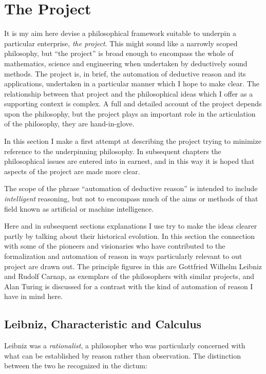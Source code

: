 
\chapter{The Project}\label{TheProject}

It is my aim here devise a philosophical framework suitable to
underpin a particular enterprise, \emph{the project}. 
This might sound like a narrowly scoped philosophy, but ``the
project'' is broad enough to encompass the whole of mathematics,
science and engineering when undertaken by deductively sound methods. 
The project is, in brief, the automation of deductive reason and its
applications, undertaken in a particular manner which I hope to make
clear. 
The relationship between that project and the philosophical ideas
which I offer as a supporting context is complex. 
A full and detailed account of the project depends upon the
philosophy, but the project plays an important role in the
articulation of the philosophy, they are hand-in-glove. 

In this section I make a first attempt at describing the project
trying to minimize reference to the underpinning philosophy. 
In subsequent chapters the philosophical issues are entered into in
earnest, and in this way it is hoped that aspects of the project are
made more clear. 

The scope of the phrase ``automation of deductive reason'' is intended
to include \emph{intelligent} reasoning, but not to encompass much of
the aims or methods of that field known as artificial or machine
intelligence. 

Here and in subsequent sections explanations I use try to make the
ideas clearer partly by talking about their historical evolution. 
In this section the connection with some of the pioneers and
visionaries who have contributed to the formalization and automation
of reason in ways particularly relevant to out project are drawn out. 
The principle figures in this are Gottfried Wilhelm Leibniz and Rudolf
Carnap, as exemplars of the philosophers with similar projects, and
Alan Turing is discussed for a contrast with the kind of automation of
reason I have in mind here. 

\section{Leibniz, Characteristic and Calculus}

Leibniz was a \emph{rationalist}, a philosopher who was particularly
concerned with what can be established by reason rather than
observation. 
The distinction between the two he recognized in the dictum:

